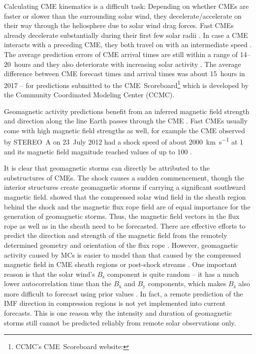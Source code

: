 Calculating CME kinematics is a difficult task: Depending on whether CMEs are faster or slower than the surrounding solar wind, they decelerate/accelerate on their way through the heliosphere due to solar wind drag forces. Fast CMEs already decelerate substantially during their first few solar radii \citep{Sachdeva2017}. In case a CME interacts with a preceding CME, they both travel on with an intermediate speed \citep{Manoharan2004,Temmer2012}.
The average prediction errors of CME arrival times are still within a range of 14--20~hours and they also deteriorate with increasing solar activity \citep{Vrsnak2014}. The average difference between CME forecast times and arrival times was about 15~hours in 2017 -- for predictions submitted to the CME~Scoreboard\footnote{CCMC's CME~Scoreboard website: } which is developed by the Community Coordinated Modeling Center (CCMC).

Geomagnetic activity predictions benefit from an inferred magnetic field strength and direction along the line Earth passes through the CME \citep{Savani2017}.
Fast CMEs usually come with high magnetic field strengths as well, for example the CME observed by STEREO~A on 23~July 2012 had a shock speed of about \SI{2000}{\km\per\s} at \SI{1}{\au} and its magnetic field magnitude reached values of up to \SI{100}{\nT} \citep{Russell2013}.

It is clear that geomagnetic storms can directly be attributed to the substructures of CMEs. The shock causes a sudden commencement, though the interior structures create geomagnetic storms if carrying a significant southward magnetic field. \citet{Tsurutani1988} showed that the compressed solar wind field in the sheath region behind the shock and the magnetic flux rope field are of equal importance for the generation of geomagnetic storms. Thus, the magnetic field vectors in the flux rope as well as in the sheath need to be forecasted.
There are effective efforts to predict the direction and strength of the magnetic field from the remotely determined geometry and orientation of the flux rope \citep{Savani2015}. However, geomagnetic activity caused by MCs is easier to model than that caused by the compressed magnetic field in CME sheath regions or post-shock streams \citep{Huttunen2004}. One important reason is that the solar wind's $B_\text{z}$ component is quite random -- it has a much lower autocorrelation time than the $B_\text{x}$ and $B_\text{y}$ components, which makes $B_\text{z}$ also more difficult to forecast using prior values \citep{Elliott2013}. In fact, a remote prediction of the IMF direction in compression regions is not yet implemented into current forecasts. This is one reason why the intensity and duration of geomagnetic storms still cannot be predicted reliably from remote solar observations only.

